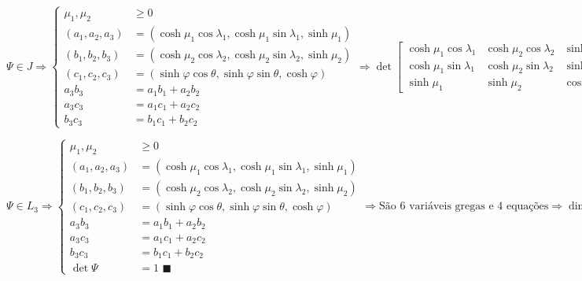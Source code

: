 \documentclass[10pt,a4paper]{article}
\begin{document}
		\begin{equation*}
		\Psi \in J \Rightarrow
			\left\{\begin{aligned}
				\mu_1, \mu_2 &\ge 0 \\
			    (a_1, a_2, a_3) &= (\cosh \mu_1 \cos \lambda_1, \cosh \mu_1 \sin \lambda_1, \sinh \mu_1) \\
			    (b_1, b_2, b_3) &= (\cosh \mu_2 \cos \lambda_2, \cosh \mu_2 \sin \lambda_2, \sinh \mu_2) \\
			    (c_1, c_2, c_3) &= (\sinh \varphi \cos \theta, \sinh \varphi \sin \theta, \cosh \varphi) \\
			    a_3 b_3 &= a_1 b_1 + a_2 b_2 \\
			    a_3 c_3 &= a_1 c_1 + a_2 c_2 \\
			    b_3 c_3 &= b_1 c_1 + b_2 c_2
			\end{aligned} \Rightarrow \det \left[ \begin{matrix} \cosh \mu_1 \cos \lambda_1 & \cosh \mu_2 \cos \lambda_2 & \sinh \varphi \cos \theta \\ \cosh \mu_1 \sin \lambda_1 & \cosh \mu_2 \sin \lambda_2 & \sinh \varphi \sin \theta \\ \sinh \mu_1 & \sinh \mu_2 & \cosh \varphi \end{matrix} \right] = \,?
			\right.
		\end{equation*}

		\begin{equation*}
		\Psi \in L_3 \Rightarrow
			\left\{\begin{aligned}
				\mu_1, \mu_2 &\ge 0 \\
			    (a_1, a_2, a_3) &= (\cosh \mu_1 \cos \lambda_1, \cosh \mu_1 \sin \lambda_1, \sinh \mu_1) \\
			    (b_1, b_2, b_3) &= (\cosh \mu_2 \cos \lambda_2, \cosh \mu_2 \sin \lambda_2, \sinh \mu_2) \\
			    (c_1, c_2, c_3) &= (\sinh \varphi \cos \theta, \sinh \varphi \sin \theta, \cosh \varphi) \\
			    a_3 b_3 &= a_1 b_1 + a_2 b_2 \\
			    a_3 c_3 &= a_1 c_1 + a_2 c_2 \\
			    b_3 c_3 &= b_1 c_1 + b_2 c_2 \\
			    \det \Psi &= 1\,\,\blacksquare
			\end{aligned}
			\right. \Rightarrow \text{S\~ao 6 vari\'aveis gregas e 4 equa\c{c}\~oes} \Rightarrow \dim L_3 = 2
		\end{equation*}
\end{document}
